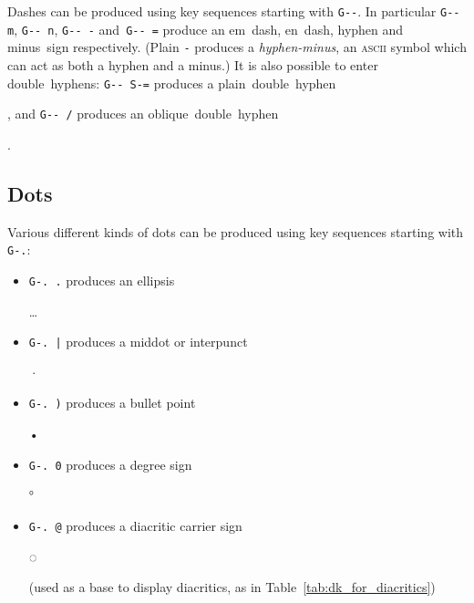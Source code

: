 \documentclass[oneside]{memoir}
\newcommand{\key}{\verb}
\newcommand{\out}[1]{\colorbox{gray!20}{\strut{}#1}}
\begin{document}
{{{Dashes can be produced using key sequences starting with \key|G--|.
In particular \key|G-- m|, \key|G-- n|, \key|G-- -| and~\key|G-- =|
  produce an em~dash, en~dash, hyphen and minus~sign respectively.
(Plain \key|-| produces a \textit{hyphen-minus},
  an \textsc{ascii} symbol which can act as both a hyphen and a minus.)
It is also possible to enter double~hyphens:
  \key|G-- S-=| produces a plain~double~hyphen \out{}, and \key|G-- /| produces an oblique~double~hyphen \out{}.

\subsection{Dots}
\label{sec:dots}

Various different kinds of dots can be produced using key sequences starting with \key|G-.|:

\begin{itemize}[noitemsep]
\item \key|G-. .| produces an ellipsis \out{…}
\item \key!G-. |! produces a middot or interpunct \out{·}
\item \key|G-. )| produces a bullet point \out{•}
\item \key|G-. 0| produces a degree sign \out{°}
\item \key|G-. @| produces a diacritic carrier sign \out{◌}
  (used as a base to display diacritics, as in Table~\ref{tab:dk_for_diacritics})
\end{itemize}

}}}
\end{document}
